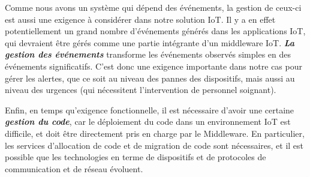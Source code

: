 Comme nous avons un système qui dépend des événements, la gestion de ceux-ci est aussi une exigence à considérer dans notre solution IoT. Il y a en effet potentiellement un grand nombre d'événements générés dans les applications IoT, qui devraient être gérés comme une partie intégrante d'un middleware IoT.  \textbf{\textit{La gestion des événements}} transforme les événements observés simples en des événements significatifs. C'est donc une exigence importante dans notre cas pour gérer les alertes, que ce soit au niveau des pannes des dispositifs, mais aussi au niveau des urgences (qui nécessitent l’intervention de personnel soignant).

Enfin, en temps qu'exigence fonctionnelle, il est nécessaire d'avoir une certaine \textbf{\textit{gestion du code}}, car le déploiement du code dans un environnement IoT est difficile, et doit être directement pris en charge par le Middleware. En particulier, les services d'allocation de code et de migration de code sont nécessaires, et il est possible que les technologies en terme de dispositifs et de protocoles de communication et de réseau évoluent.